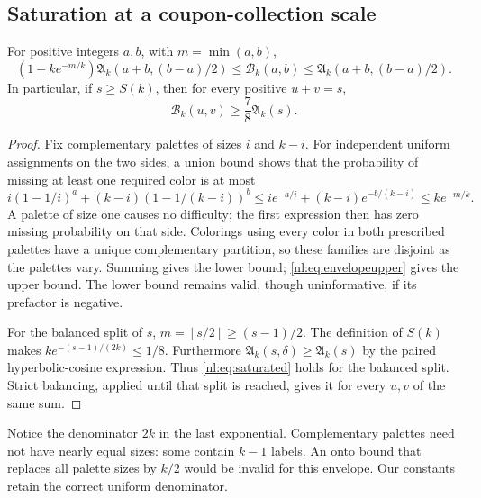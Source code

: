 \documentclass[11pt,a4paper]{article}
\numberwithin{equation}{section}
\theoremstyle{definition}
\theoremstyle{remark}
\newcommand{\Bip}{\mathcal B}
\newcommand{\nlenv}{\mathfrak A}
\newcommand{\nlfloor}[1]{\left\lfloor #1\right\rfloor}
\begin{document}
\subsection{Saturation at a coupon-collection scale}
\begin{lemma}\label{nl:lem:onto}
For positive integers $a,b$, with $m=\min(a,b)$,
\begin{equation}\label{nl:eq:ontoenvelope}
 (1-k e^{-m/k})\nlenv_k(a+b,(b-a)/2)
 \le\Bip_k(a,b)\le\nlenv_k(a+b,(b-a)/2).
\end{equation}
In particular, if $s\ge S(k)$, then for every positive $u+v=s$,
\begin{equation}\label{nl:eq:saturated}
 \Bip_k(u,v)\ge\frac78\nlenv_k(s).
\end{equation}
\end{lemma}
\begin{proof}
Fix complementary palettes of sizes $i$ and $k-i$. For independent uniform
assignments on the two sides, a union bound shows that the probability of
missing at least one required color is at most
\[
 i(1-1/i)^a+(k-i)(1-1/(k-i))^b
 \le i e^{-a/i}+(k-i)e^{-b/(k-i)}
 \le k e^{-m/k}.
\]
A palette of size one causes no difficulty; the first expression then has
zero missing probability on that side. Colorings using every color in
both prescribed palettes have a unique complementary partition, so these
families are disjoint as the palettes vary. Summing gives the lower bound;
\eqref{nl:eq:envelopeupper} gives the upper bound. The lower bound remains
valid, though uninformative, if its prefactor is negative.

For the balanced split of $s$, $m=\nlfloor{s/2}\ge(s-1)/2$.
The definition of $S(k)$ makes $ke^{-(s-1)/(2k)}\le1/8$.
Furthermore $\nlenv_k(s,\delta)\ge\nlenv_k(s)$ by the paired hyperbolic-cosine
expression. Thus \eqref{nl:eq:saturated} holds for the balanced split.
Strict balancing, applied until that split is reached, gives it for every
$u,v$ of the same sum.
\end{proof}

Notice the denominator $2k$ in the last exponential. Complementary palettes
need not have nearly equal sizes: some contain $k-1$ labels. An onto bound
that replaces all palette sizes by $k/2$ would be invalid for this envelope.
Our constants retain the correct uniform denominator.
\end{document}
